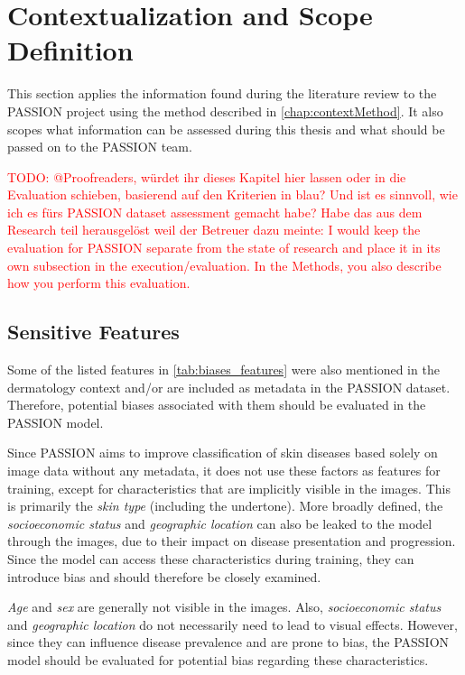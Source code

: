 \documentclass[12pt, a4paper, oneside]{book}   	%
\renewcommand{\todo}[1]{\textcolor{red}{TODO: #1}}
\begin{document}
		\section{Contextualization and Scope Definition}
		This section applies the information found during the literature review to the PASSION project using the method described in \autoref{chap:contextMethod}. It also scopes what information can be assessed during this thesis and what should be passed on to the PASSION team.
		
		\todo{@Proofreaders, würdet ihr dieses Kapitel hier lassen oder in die Evaluation schieben, basierend auf den Kriterien in blau? Und ist es sinnvoll, wie ich es fürs PASSION dataset assessment gemacht habe?
		Habe das aus dem Research teil herausgelöst weil der Betreuer dazu meinte: I would keep the evaluation for PASSION separate from the state of research and place it in its own subsection in the execution/evaluation.
		In the Methods, you also describe how you perform this evaluation.}
		
		\subsection{Sensitive Features}
			Some of the listed features in \autoref{tab:biases_features} were also mentioned in the dermatology context and/or are included as metadata in the PASSION dataset. Therefore, potential biases associated with them should be evaluated in the PASSION model.
			
			Since PASSION aims to improve classification of skin diseases based solely on image data without any metadata, it does not use these factors as features for training, except for characteristics that are implicitly visible in the images. This is primarily the \textit{skin type} (including the undertone). More broadly defined, the \textit{socioeconomic status} and \textit{geographic location} can also be leaked to the model through the images, due to their impact on disease presentation and progression. Since the model can access these characteristics during training, they can introduce bias and should therefore be closely examined.
			
			\textit{Age} and \textit{sex} are generally not visible in the images. Also, \textit{socioeconomic status} and \textit{geographic location} do not necessarily need to lead to visual effects. However, since they can influence disease prevalence and are prone to bias, the PASSION model should be evaluated for potential bias regarding these characteristics.
			
\end{document}
